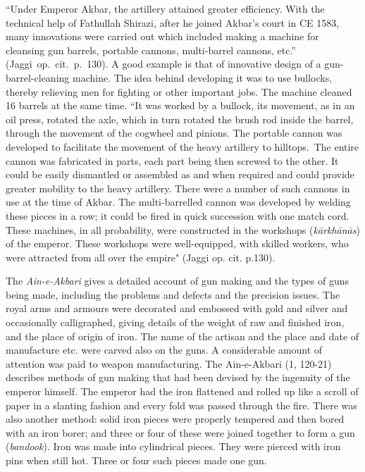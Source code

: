 ``Under Emperor Akbar, the artillery attained greater efficiency. With the technical help of Fathullah Shirazi, after he joined Akbar’s court in CE 1583, many innovations were carried out which included making a machine for cleansing gun barrels, portable cannons, multi-barrel cannons, etc.” (Jaggi~op.~cit.~p.~130). A good example is that of innovative design of a gun-barrel-cleaning machine. The idea behind developing it was to use bullocks, thereby relieving men for fighting or other important jobs. The machine cleaned 16 barrels at the same time. ``It was worked by a bullock, its movement, as in an oil press, rotated the axle, which in turn rotated the brush rod inside the barrel, through the movement of the cogwheel and pinions. The portable cannon was developed to facilitate the movement of the heavy artillery to hilltops.~The entire cannon was fabricated in parts, each part being then screwed to the other. It could be easily dismantled or assembled as and when required and could provide greater mobility to the heavy artillery. There were a number of such cannons in use at the time of Akbar. The multi-barrelled cannon was developed by welding these pieces in a row; it could be fired in quick succession with one match cord. These machines, in all probability, were constructed in the workshops ({\it kārkhānās}) of the emperor. These workshops were well-equipped, with skilled workers, who were attracted from all over the empire" (Jaggi op. cit. p.130).

The {\it Ain-e-Akbari} gives a detailed account of gun making and the types of guns being made, including the problems and defects and the precision issues. The royal arms and armours were decorated and embossed with gold and silver and occasionally calligraphed, giving details of the weight of raw and finished iron, and the place of origin of iron. The name of the artisan and the place and date of manufacture etc. were carved also on the guns. A considerable amount of attention was paid to weapon manufacturing. The Ain-e-Akbari (1, 120-21) describes methods of gun making that had been devised by the ingenuity of the emperor himself. The emperor had the iron flattened and rolled up like a scroll of paper in a slanting fashion and every fold was passed through the fire. There was also another method: solid iron pieces were properly tempered and then bored with an iron borer; and three or four of these were joined together to form a gun ({\it bandook}). Iron was made into cylindrical pieces. They were pierced with iron pins when still hot. Three or four such pieces made one gun. 

